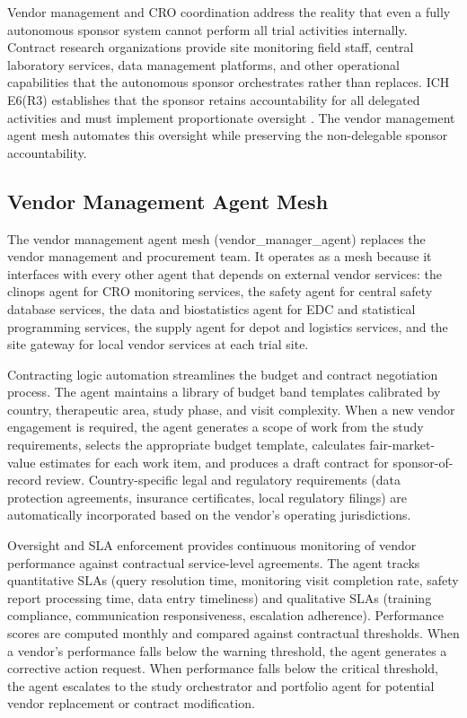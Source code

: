 
Vendor management and CRO coordination address the reality that even a fully autonomous
sponsor system cannot perform all trial activities internally. Contract research
organizations provide site monitoring field staff, central laboratory services, data
management platforms, and other operational capabilities that the autonomous sponsor
orchestrates rather than replaces. ICH E6(R3) establishes that the sponsor retains
accountability for all delegated activities and must implement proportionate oversight
\cite{ich-e6r3}. The vendor management agent mesh automates this oversight while preserving
the non-delegable sponsor accountability.

\subsection{Vendor Management Agent Mesh}

The vendor management agent mesh (vendor\_manager\_agent) replaces the vendor management and
procurement team. It operates as a mesh because it interfaces with every other agent that
depends on external vendor services: the clinops agent for CRO monitoring services, the
safety agent for central safety database services, the data and biostatistics agent for EDC
and statistical programming services, the supply agent for depot and logistics services, and
the site gateway for local vendor services at each trial site.

Contracting logic automation streamlines the budget and contract negotiation process.
The agent maintains a library of budget band templates calibrated by country, therapeutic
area, study phase, and visit complexity. When a new vendor engagement is required, the
agent generates a scope of work from the study requirements, selects the appropriate
budget template, calculates fair-market-value estimates for each work item, and produces
a draft contract for sponsor-of-record review. Country-specific legal and regulatory
requirements (data protection agreements, insurance certificates, local regulatory
filings) are automatically incorporated based on the vendor's operating jurisdictions.

Oversight and SLA enforcement provides continuous monitoring of vendor performance against
contractual service-level agreements. The agent tracks quantitative SLAs (query resolution
time, monitoring visit completion rate, safety report processing time, data entry timeliness)
and qualitative SLAs (training compliance, communication responsiveness, escalation
adherence). Performance scores are computed monthly and compared against contractual
thresholds. When a vendor's performance falls below the warning threshold, the agent
generates a corrective action request. When performance falls below the critical threshold,
the agent escalates to the study orchestrator and portfolio agent for potential vendor
replacement or contract modification.

